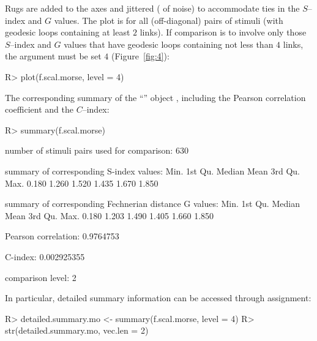 \documentclass[nojss]{jss}
\begin{document}
Rugs are added to the axes and jittered ( of noise) to accommodate ties in the $S$--index and $G$ values.
The plot is for all (off-diagonal) pairs of stimuli (with geodesic loops containing at least $2$ links). If comparison is to involve 
only those $S$--index and $G$ values that have geodesic loops containing not less than $4$ links, the argument  must be set
$4$ (Figure~\ref{fig:4}):
\begin{CodeChunk}
\begin{CodeInput}
R> plot(f.scal.morse, level = 4)
\end{CodeInput}
\end{CodeChunk}

The corresponding summary of the ``'' object , 
including the Pearson correlation coefficient and the $C$--index:
\begin{CodeChunk}
\begin{CodeInput}
R> summary(f.scal.morse)
\end{CodeInput}
\begin{CodeOutput}
number of stimuli pairs used for comparison: 630 

summary of corresponding S-index values:
   Min. 1st Qu.  Median    Mean 3rd Qu.    Max. 
  0.180   1.260   1.520   1.435   1.670   1.850 

summary of corresponding Fechnerian distance G values:
   Min. 1st Qu.  Median    Mean 3rd Qu.    Max. 
  0.180   1.203   1.490   1.405   1.660   1.850 

Pearson correlation: 0.9764753 

C-index: 0.002925355 

comparison level: 2
\end{CodeOutput}
\end{CodeChunk}

In particular, detailed summary information can be accessed through assignment:
\begin{CodeChunk}
\begin{CodeInput}
R> detailed.summary.mo <- summary(f.scal.morse, level = 4)
R> str(detailed.summary.mo, vec.len = 2)
\end{CodeInput}
\end{CodeChunk}
\end{document}
